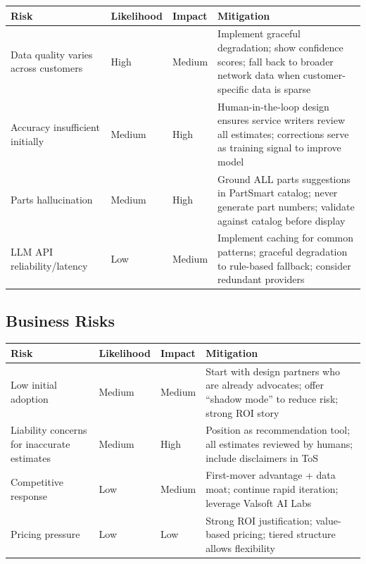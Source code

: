 \documentclass[11pt,a4paper]{article}
\begin{document}
\begin{table}[H]
\centering
\small
\begin{tabularx}{\textwidth}{@{}L{3cm}C{1.8cm}C{1.5cm}L{6cm}@{}}
\toprule
\textbf{Risk} & \textbf{Likelihood} & \textbf{Impact} & \textbf{Mitigation} \\
\midrule
Data quality varies across customers & High & Medium & Implement graceful degradation; show confidence scores; fall back to broader network data when customer-specific data is sparse \\
\addlinespace
Accuracy insufficient initially & Medium & High & Human-in-the-loop design ensures service writers review all estimates; corrections serve as training signal to improve model \\
\addlinespace
Parts hallucination & Medium & High & Ground ALL parts suggestions in PartSmart catalog; never generate part numbers; validate against catalog before display \\
\addlinespace
LLM API reliability/latency & Low & Medium & Implement caching for common patterns; graceful degradation to rule-based fallback; consider redundant providers \\
\bottomrule
\end{tabularx}
\end{table}

\subsection{Business Risks}

\begin{table}[H]
\centering
\small
\begin{tabularx}{\textwidth}{@{}L{3cm}C{1.8cm}C{1.5cm}L{6cm}@{}}
\toprule
\textbf{Risk} & \textbf{Likelihood} & \textbf{Impact} & \textbf{Mitigation} \\
\midrule
Low initial adoption & Medium & Medium & Start with design partners who are already advocates; offer ``shadow mode'' to reduce risk; strong ROI story \\
\addlinespace
Liability concerns for inaccurate estimates & Medium & High & Position as recommendation tool; all estimates reviewed by humans; include disclaimers in ToS \\
\addlinespace
Competitive response & Low & Medium & First-mover advantage + data moat; continue rapid iteration; leverage Valsoft AI Labs \\
\addlinespace
Pricing pressure & Low & Low & Strong ROI justification; value-based pricing; tiered structure allows flexibility \\
\bottomrule
\end{tabularx}
\end{table}
\end{document}
